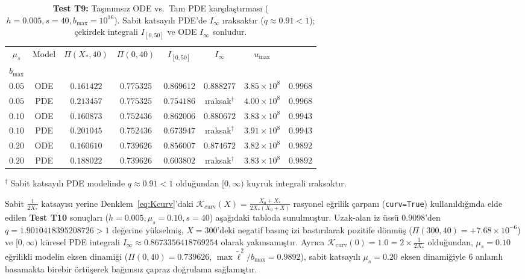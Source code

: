 \documentclass[12pt,a4paper]{article}
\begin{document}
\begin{table}[htbp]
\centering
\footnotesize
\setlength{\tabcolsep}{1pt}
\caption{\textbf{Test T9:} Taşınımsız ODE vs.\ Tam PDE karşılaştırması ($h=0.005, s=40, b_{\max}=10^{16}$). Sabit katsayılı PDE'de $I_\infty$ ıraksaktır ($q\approx 0.91 < 1$); çekirdek integrali $I_{[0,50]}$ ve ODE $I_\infty$ sonludur.}
\vspace{0.1cm}
\begin{tabular}{@{}c|c|cc|cc|c|c@{}}
\hline
$\mu_s$ & Model & $\Pi(X_*,40)$ & $\Pi(0,40)$ & $I_{[0,50]}$ & $I_\infty$ & $u_{\max}$ & \shortstack{$\max \tilde{\ell}^2/$ \\ $b_{\max}$} \\
\hline
$0.05$ & ODE & $0.161422$ & $0.775325$ & $0.869612$ & $0.888277$ & $3.85\times 10^{8}$ & $0.9968$ \\
$0.05$ & PDE & $0.213457$ & $0.775325$ & $0.754186$ & ıraksak$^\dagger$ & $4.00\times 10^{8}$ & $0.9968$ \\
$0.10$ & ODE & $0.160873$ & $0.752436$ & $0.862006$ & $0.880672$ & $3.83\times 10^{8}$ & $0.9943$ \\
$0.10$ & PDE & $0.201045$ & $0.752436$ & $0.673947$ & ıraksak$^\dagger$ & $3.91\times 10^{8}$ & $0.9943$ \\
$0.20$ & ODE & $0.160610$ & $0.739626$ & $0.856007$ & $0.874672$ & $3.82\times 10^{8}$ & $0.9892$ \\
$0.20$ & PDE & $0.188022$ & $0.739626$ & $0.603802$ & ıraksak$^\dagger$ & $3.83\times 10^{8}$ & $0.9892$ \\
\hline
\end{tabular}

{\footnotesize $^\dagger$ Sabit katsayılı PDE modelinde $q \approx 0.91 < 1$ olduğundan $[0,\infty)$ kuyruk integrali ıraksaktır.\par}
\end{table}

Sabit $\frac{1}{2X_*}$ katsayısı yerine Denklem~\eqref{eq:Kcurv}'daki $\mathcal{K}_{\mathrm{curv}}(X) = \frac{X_0+X_*}{2X_*(X_0+X)}$ rasyonel eğrilik çarpanı (\texttt{curv=True}) kullanıldığında elde edilen \textbf{Test T10} sonuçları ($h=0.005, \mu_s=0.10, s=40$) aşağıdaki tabloda sunulmuştur. Uzak-alan iz üssü $0.9098$'den $q = 1.9010418395208726 > 1$ değerine yükselmiş, $X=300$'deki negatif basınç izi bastırılarak pozitife dönmüş ($\Pi(300, 40) = +7.68 \times 10^{-6}$) ve $[0,\infty)$ küresel PDE integrali $I_\infty \approx 0.8673356418769254$ olarak yakınsamıştır. Ayrıca $\mathcal{K}_{\mathrm{curv}}(0) = 1.0 = 2 \times \frac{1}{2X_*}$ olduğundan, $\mu_s = 0.10$ eğrilikli modelin eksen dinamiği ($\Pi(0,40) = 0.739626$, $\max \tilde{\ell}^2/b_{\max} = 0.9892$), sabit katsayılı $\mu_s = 0.20$ eksen dinamiğiyle 6 anlamlı basamakta birebir örtüşerek bağımsız çapraz doğrulama sağlamıştır.
\end{document}
